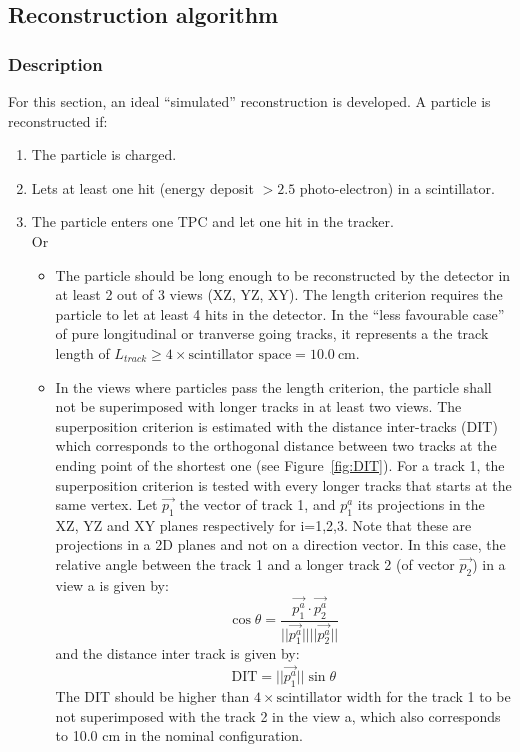 \subsection{Reconstruction algorithm}
\label{Sec:Reco}
\subsubsection{Description}
For this section, an ideal ``simulated'' reconstruction is developed. A particle is reconstructed if:
\begin{enumerate}
\item The particle is charged.
\item Lets at least one hit (energy deposit $> 2.5$ photo-electron) in a scintillator.\\
\item The particle enters one TPC and let one hit in the tracker.\\
  Or\\
  \begin{itemize}
  \item The particle should be long enough to be reconstructed by the detector in at least 2 out of 3 views (XZ, YZ, XY). The length criterion requires the particle to let at least 4 hits in the detector. In the ``less favourable case'' of pure longitudinal or tranverse going tracks, it represents a the track length of $L_{track} \geq  4 \times \text{scintillator space} = 10.0~$cm.
  \item In the views where particles pass the length criterion, the particle shall not be superimposed with longer tracks in at least two views. The superposition criterion is estimated with the distance inter-tracks (DIT) which corresponds to the orthogonal distance between two tracks at the ending point of the shortest one (see Figure~\ref{fig:DIT}). For a track 1, the superposition criterion is tested with every longer tracks that starts at the same vertex. Let $\vec{p_{1}}$ the vector of track 1, and $p_{1}^{a}$ its projections in the XZ, YZ and XY planes respectively for i=1,2,3. Note that these are projections in a 2D planes and not on a direction vector. In this case, the relative angle between the track 1 and a longer track 2 (of vector $\vec{p_{2}}$) in a view a is given by:
\begin{equation}
  \cos \theta = \frac{\vec{p_{1}^{a}} \cdot \vec{p_{2}^{a}}}{||\vec{p_{1}^{a}}|| ||\vec{p_{2}^{a}}||} 
\end{equation}
and the distance inter track is given by:
\begin{equation}
  \text{DIT} = ||\vec{p_{1}^{a}}|| \sin \theta
\end{equation}
The DIT should be higher than $4 \times \text{scintillator width}$ for the track 1 to be not superimposed with the track 2 in the view a, which also corresponds to 10.0 cm in the nominal configuration.
  \end{itemize} 
\end{enumerate}
